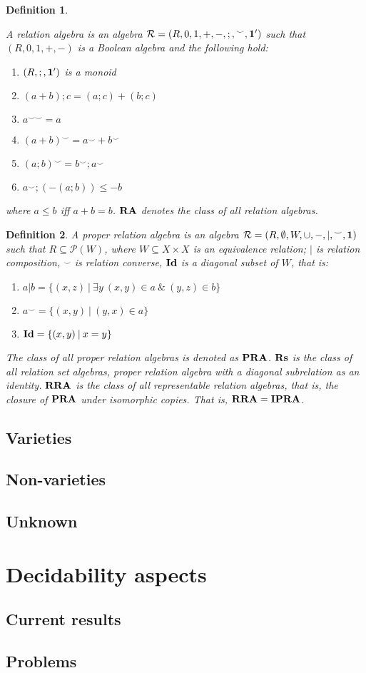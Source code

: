 \documentclass[a4paper]{article}
\theoremstyle{defin}
\newtheorem{definition}{Definition}
\theoremstyle{theorem}
\theoremstyle{claim}
\theoremstyle{prop}
\theoremstyle{lemma}
\theoremstyle{fact}
\theoremstyle{ex}
\theoremstyle{col}
\begin{document}
\begin{definition}
  $ $

    A relation algebra is an algebra $\mathcal{R} = (R, 0, 1, +, -, ;, {}^{\smile}, {\bf 1'})$ such that $(R, 0, 1, +, -)$ is a Boolean algebra and the following hold:
    \begin{enumerate}
      \item $(R, ;, {\bf 1'})$ is a monoid
      \item $(a + b) ; c = (a ; c) + (b ; c)$
      \item $a^{\smile \smile} = a$
      \item $(a + b)^{\smile} = a^{\smile} + b^{\smile}$
      \item $(a ; b)^{\smile} = b^{\smile} ; a^{\smile}$
      \item $a^{\smile} ; (- (a ; b)) \leq - b$
    \end{enumerate}
    where $a \leq b$ iff $a + b = b$. ${\bf RA}$ denotes the class of all relation algebras.
\end{definition}

\begin{definition}
    A proper relation algebra is an algebra $\mathcal{R} = (R, \emptyset,W, \cup, -, |, {}^{\smile}, {\bf 1 })$ such that $R \subseteq \mathcal{P}(W)$, where $W \subseteq X \times X$ is an equivalence relation; $|$ is relation composition, ${}^{\smile}$ is relation converse, ${\bf Id}$ is a
    diagonal subset of $W$, that is:
    \begin{enumerate}
    \item $a | b = \{ (x, z) \: | \: \exists y \: (x, y) \in a \: \& \: (y, z) \in b \}$
    \item $a^{\smile} = \{ (x, y) \: | \: (y, x) \in a \}$
    \item ${\bf Id} = \{ (x, y) \: | \: x = y \}$
    \end{enumerate}
      The class of all proper relation algebras is denoted as ${\bf PRA}$. ${\bf Rs}$ is the class of all relation set algebras, proper relation algebra with a diagonal subrelation as an identity. ${\bf RRA}$ is the class of all representable relation algebras, that is, the closure of ${\bf PRA}$ under isomorphic copies. That is,
      ${\bf RRA} = {\bf IPRA}$.
\end{definition}



\subsection{Varieties}
\subsection{Non-varieties}
\subsection{Unknown}

\section{Decidability aspects}
\subsection{Current results}
\subsection{Problems}



\end{document}
